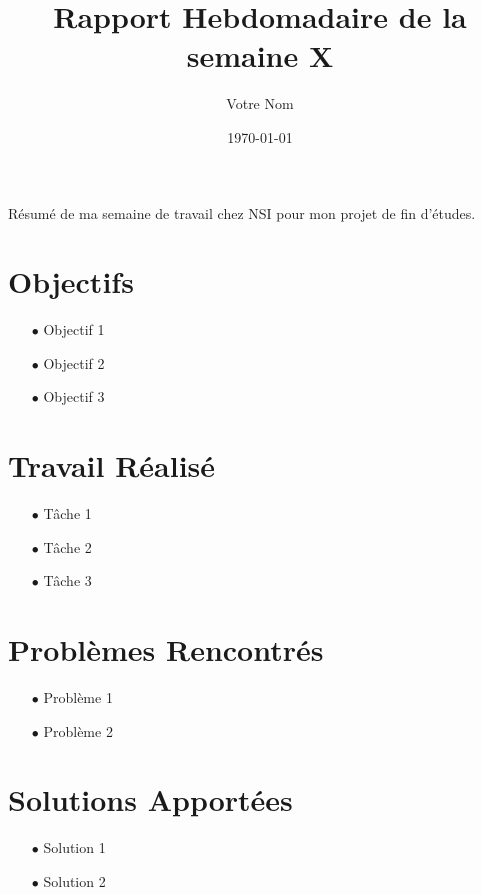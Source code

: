 \documentclass[a4paper, 12pt]{article}
\title{Rapport Hebdomadaire de la semaine X}
\author{Votre Nom}
\date{\today}
\begin{document}
\maketitle

Résumé de ma semaine de travail chez NSI pour mon projet de fin d’études.

\section*{Objectifs}
\begin{itemize}
    \item[$\bullet$] Objectif 1
    \item[$\bullet$] Objectif 2
    \item[$\bullet$] Objectif 3
\end{itemize}

\section*{Travail Réalisé}
\begin{itemize}
    \item[$\bullet$] Tâche 1
    \item[$\bullet$] Tâche 2
    \item[$\bullet$] Tâche 3
\end{itemize}

\section*{Problèmes Rencontrés}
\begin{itemize}
    \item[$\bullet$] Problème 1
    \item[$\bullet$] Problème 2
\end{itemize}

\section*{Solutions Apportées}
\begin{itemize}
    \item[$\bullet$] Solution 1
    \item[$\bullet$] Solution 2
\end{itemize}
\end{document}
